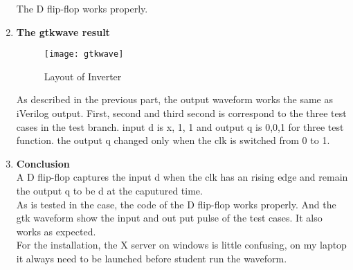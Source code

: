 \documentclass[12pt,titlepage]{article}
\begin{document}
\begin{enumerate}[noitemsep]
\begin{itemize}
    \end{itemize}
      The D flip-flop works properly.
      \clearpage

\item \textbf{The gtkwave result}
    \begin{figure}[H]
	   \centering
	   \texttt{[image: gtkwave]}
	   \caption{Layout of Inverter}
    \end{figure}
    As described in the previous part, the output waveform works the same as iVerilog output. First, second and third second is correspond to the three test cases in the test branch. input d is x, 1, 1 and output q is 0,0,1 for three test function. the output q changed only when the clk is switched from 0 to 1.\\

\item \textbf{Conclusion}\\
A D flip-flop captures the input d when the clk has an rising edge and remain the output q to be d at the caputured time.\\
As is tested in the case, the code of the D flip-flop works properly. And the gtk waveform show the input and out put pulse of the test cases. It also works as expected.\\
For the installation, the X server on windows is little confusing, on my laptop it always need to be launched before student run the waveform.


\end{enumerate}
\end{document}
